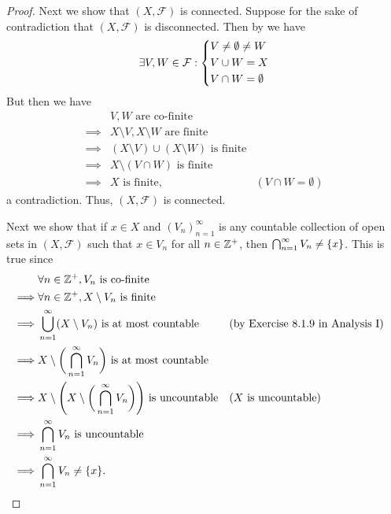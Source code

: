 \begin{proof}
  Next we show that \((X, \mathcal{F})\) is connected.
  Suppose for the sake of contradiction that \((X, \mathcal{F})\) is disconnected.
  Then by  we have
  \[
    \exists V, W \in \mathcal{F} : \begin{dcases}
      V \neq \emptyset \neq W \\
      V \cup W = X            \\
      V \cap W = \emptyset
    \end{dcases}
  \]
  But then we have
  \begin{align*}
             & V, W \text{ are co-finite}                                                      \\
    \implies & X \setminus V, X \setminus W \text{ are finite}                                 \\
    \implies & (X \setminus V) \cup (X \setminus W) \text{ is finite}                          \\
    \implies & X \setminus (V \cap W) \text{ is finite}                                        \\
    \implies & X \text{ is finite},                                   & (V \cap W = \emptyset)
  \end{align*}
  a contradiction.
  Thus, \((X, \mathcal{F})\) is connected.

  Next we show that if \(x \in X\) and \((V_n)_{n = 1}^\infty\) is any countable collection of open sets in \((X, \mathcal{F})\) such that \(x \in V_n\) for all \(n \in \mathbb{Z}^+\), then \(\bigcap_{n = 1}^\infty V_n \neq \left\lbrace x\right\rbrace\).
  This is true since
  \begin{align*}
             & \forall n \in \Z^+, V_n \text{ is co-finite}                                                                                                    \\
    \implies & \forall n \in \Z^+, X \setminus V_n \text{ is finite}                                                                                           \\
    \implies & \bigcup_{n = 1}^\infty (X \setminus V_n) \text{ is at most countable}                             &  & \text{(by Exercise 8.1.9 in Analysis I)} \\
    \implies & X \setminus \bigg(\bigcap_{n = 1}^\infty V_n\bigg) \text{ is at most countable}                                                                 \\
    \implies & X \setminus \Bigg(X \setminus \bigg(\bigcap_{n = 1}^\infty V_n\bigg)\Bigg) \text{ is uncountable} &  & \text{(\(X\) is uncountable)}            \\
    \implies & \bigcap_{n = 1}^\infty V_n \text{ is uncountable}                                                                                               \\
    \implies & \bigcap_{n = 1}^\infty V_n \neq \set{x}.
  \end{align*}


\end{proof}
